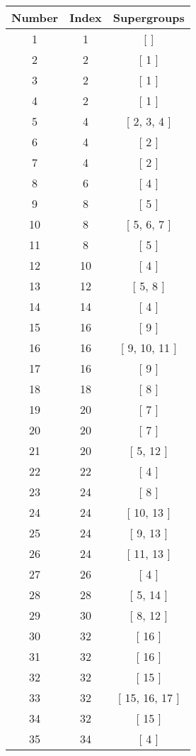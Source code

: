 \begin{center}
\begin{longtable}[H]{|| c c c ||}
\hline
Number & Index & Supergroups \\ 
\hline
1 & 1 & [ ] \\ 
\hline
2 & 2 & [ 1 ] \\ 
\hline
3 & 2 & [ 1 ] \\ 
\hline
4 & 2 & [ 1 ] \\ 
\hline
5 & 4 & [ 2, 3, 4 ] \\ 
\hline
6 & 4 & [ 2 ] \\ 
\hline
7 & 4 & [ 2 ] \\ 
\hline
8 & 6 & [ 4 ] \\ 
\hline
9 & 8 & [ 5 ] \\ 
\hline
10 & 8 & [ 5, 6, 7 ] \\ 
\hline
11 & 8 & [ 5 ] \\ 
\hline
12 & 10 & [ 4 ] \\ 
\hline
13 & 12 & [ 5, 8 ] \\ 
\hline
14 & 14 & [ 4 ] \\ 
\hline
15 & 16 & [ 9 ] \\ 
\hline
16 & 16 & [ 9, 10, 11 ] \\ 
\hline
17 & 16 & [ 9 ] \\ 
\hline
18 & 18 & [ 8 ] \\ 
\hline
19 & 20 & [ 7 ] \\ 
\hline
20 & 20 & [ 7 ] \\ 
\hline
21 & 20 & [ 5, 12 ] \\ 
\hline
22 & 22 & [ 4 ] \\ 
\hline
23 & 24 & [ 8 ] \\ 
\hline
24 & 24 & [ 10, 13 ] \\ 
\hline
25 & 24 & [ 9, 13 ] \\ 
\hline
26 & 24 & [ 11, 13 ] \\ 
\hline
27 & 26 & [ 4 ] \\ 
\hline
28 & 28 & [ 5, 14 ] \\ 
\hline
29 & 30 & [ 8, 12 ] \\ 
\hline
30 & 32 & [ 16 ] \\ 
\hline
31 & 32 & [ 16 ] \\ 
\hline
32 & 32 & [ 15 ] \\ 
\hline
33 & 32 & [ 15, 16, 17 ] \\ 
\hline
34 & 32 & [ 15 ] \\ 
\hline
35 & 34 & [ 4 ] \\ 
\hline

\end{longtable}
\end{center}
